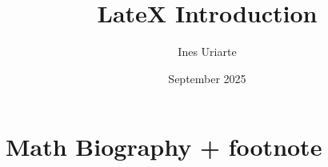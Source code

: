 \documentclass{article}
\title{LateX Introduction}
\author{Ines Uriarte}
\date{September 2025}
\begin{document}
\maketitle

\section{Math Biography + footnote}
\end{document}
